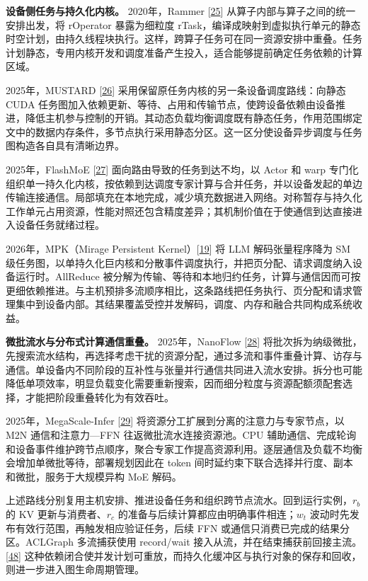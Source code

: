 \documentclass[UTF8,10.5pt,fontset=windows]{ctexart}
\begin{document}
\textbf{设备侧任务与持久化内核。} 2020年，Rammer
{[}\protect\hyperlink{ref-ma2020rammer}{25}{]}
从算子内部与算子之间的统一安排出发，将 rOperator 暴露为细粒度
rTask，编译成映射到虚拟执行单元的静态时空计划，由持久线程块执行。这样，跨算子任务可在同一资源安排中重叠。任务计划静态，专用内核开发和调度准备产生投入，适合能够提前确定任务依赖的计算区域。

2025年，MUSTARD {[}\protect\hyperlink{ref-turimbetov2025mustard}{26}{]}
采用保留原任务内核的另一条设备调度路线：向静态 CUDA
任务图加入依赖更新、等待、占用和传输节点，使跨设备依赖由设备推进，降低主机参与控制的开销。其动态负载均衡调度既有静态任务，作用范围绑定文中的数据内存条件，多节点执行采用静态分区。这一区分使设备异步调度与任务图构造各自具有清晰边界。

2025年，FlashMoE {[}\protect\hyperlink{ref-aimuyo2025flashmoe}{27}{]}
面向路由导致的任务到达不均，以 Actor 和 warp
专门化组织单一持久化内核，按依赖到达调度专家计算与合并任务，并以设备发起的单边传输连接通信。局部填充在本地完成，减少填充数据进入网络。对称暂存与持久化工作单元占用资源，性能对照还包含精度差异；其机制价值在于使通信到达直接进入设备任务就绪过程。

2026年，MPK（Mirage Persistent
Kernel）{[}\protect\hyperlink{ref-cheng2026mpk}{19}{]} 将 LLM
解码张量程序降为 SM
级任务图，以单持久化巨内核和分散事件调度执行，并把页分配、请求调度纳入设备运行时。AllReduce
被分解为传输、等待和本地归约任务，计算与通信因而可按更细依赖推进。与主机预排多流顺序相比，这条路线把任务执行、页分配和请求管理集中到设备内部。其结果覆盖受控并发解码，调度、内存和融合共同构成系统收益。

\textbf{微批流水与分布式计算通信重叠。} 2025年，NanoFlow
{[}\protect\hyperlink{ref-zhu2025nanoflow}{28}{]}
将批次拆为纳级微批，先搜索流水结构，再选择考虑干扰的资源分配，通过多流和事件重叠计算、访存与通信。单设备内不同阶段的互补性与张量并行通信共同进入流水安排。拆分也可能降低单项效率，明显负载变化需要重新搜索，因而细分粒度与资源配额须配套选择，才能把阶段重叠转化为有效吞吐。

2025年，MegaScale-Infer
{[}\protect\hyperlink{ref-zhu2025megascaleinfer}{29}{]}
将资源分工扩展到分离的注意力与专家节点，以 M2N 通信和注意力---FFN
往返微批流水连接资源池。CPU
辅助通信、完成轮询和设备事件维护跨节点顺序，聚合专家工作提高资源利用。逐层通信及负载不均衡会增加单微批等待，部署规划因此在
token 间时延约束下联合选择并行度、副本和微批，服务于大规模异构 MoE
解码。

上述路线分别复用主机安排、推进设备任务和组织跨节点流水。回到运行实例，\(r_b\)
的 KV 更新与消费者、\(r_c\) 的准备与后续计算都应由明确事件相连；\(w_t\)
波动时先发布有效行范围，再触发相应验证任务，后续 FFN
或通信只消费已完成的结果分区。ACLGraph 多流捕获使用 record/wait
接入从流，并在结束捕获前回接主流。{[}\protect\hyperlink{ref-cann910multi}{48}{]}
这种依赖闭合使并发计划可重放，而持久化缓冲区与执行对象的保存和回收，则进一步进入图生命周期管理。
\end{document}

